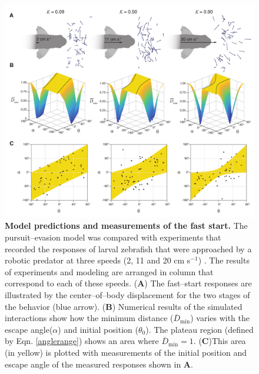 \documentclass[12pt]{article}
\newcommand{\ol}{\overline}
\begin{document}
\pagebreak
\begin{figure}[t]
\begin{centering}
\includegraphics[width=1\textwidth]{Fig_03.pdf}
\centering	
\caption{
\textbf{Model predictions and measurements of the fast start.} 
The pursuit--evasion model was compared with experiments that recorded the responses of larval zebrafish that were approached by a robotic predator at three speeds (2, 11 and 20 cm s$^{-1}$) \citep{Stewart:2014cm}. The results of experiments and modeling are arranged in column that correspond to each of these speeds.
(\textbf{A}) The fast--start responses are illustrated by the center--of--body displacement for the two stages of the behavior (blue arrow). 
(\textbf{B}) Numerical results of the simulated interactions show how the minimum distance  ($\ol D_{\text{min}}$)  varies with the escape angle($\alpha$) and initial position ($\theta_0$). The plateau region (defined by Eqn. \ref{anglerange}) shows an area where $\ol D_{\text{min}}=1$. 
(\textbf{C})This area (in yellow) is plotted with measurements of the initial position and escape angle of the measured responses shown in \textbf{A}.
}
\label{our_topo}
\end{centering}
\end{figure}
\end{document}
